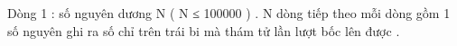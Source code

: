 Dòng 1 : số nguyên dương N ( N ≤ 100000 ) . N dòng tiếp theo mỗi dòng gồm 1 số nguyên ghi ra số chỉ trên trái bi mà thám tử lần lượt bốc lên được .